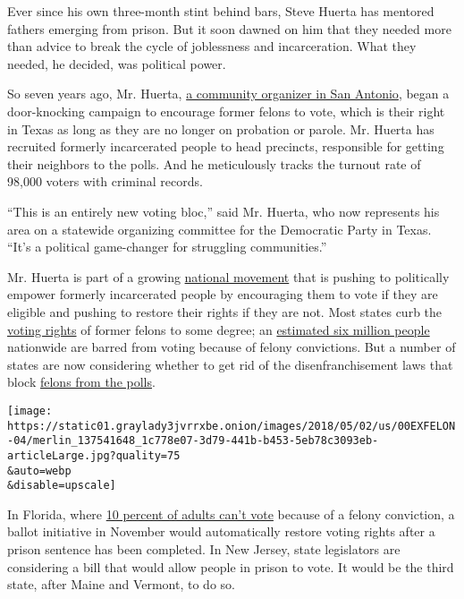 Ever since his own three-month stint behind bars, Steve Huerta has
mentored fathers emerging from prison. But it soon dawned on him that
they needed more than advice to break the cycle of joblessness and
incarceration. What they needed, he decided, was political power.

So seven years ago, Mr. Huerta,
\href{http://www.prisonerswithchildren.org/our-projects/allofus-or-none/}{a
community organizer in San Antonio}, began a door-knocking campaign to
encourage former felons to vote, which is their right in Texas as long
as they are no longer on probation or parole. Mr. Huerta has recruited
formerly incarcerated people to head precincts, responsible for getting
their neighbors to the polls. And he meticulously tracks the turnout
rate of 98,000 voters with criminal records.

``This is an entirely new voting bloc,'' said Mr. Huerta, who now
represents his area on a statewide organizing committee for the
Democratic Party in Texas. ``It's a political game-changer for
struggling communities.''

Mr. Huerta is part of a growing
\href{https://ficpmovement.wordpress.com/}{national movement} that is
pushing to politically empower formerly incarcerated people by
encouraging them to vote if they are eligible and pushing to restore
their rights if they are not. Most states curb the
\href{https://www.nytimes3xbfgragh.onion/2020/07/16/us/supreme-court-felons-voting-florida.html}{voting
rights} of former felons to some degree; an
\href{https://www.nytimes3xbfgragh.onion/interactive/2016/10/06/us/unequal-effect-of-laws-that-block-felons-from-voting.html}{estimated
six million people} nationwide are barred from voting because of felony
convictions. But a number of states are now considering whether to get
rid of the disenfranchisement laws that block
\href{https://www.nytimes3xbfgragh.onion/2020/07/16/us/supreme-court-felons-voting-florida.html}{felons
from the polls}.

\texttt{[image: https://static01.graylady3jvrrxbe.onion/images/2018/05/02/us/00EXFELON-04/merlin\_137541648\_1c778e07-3d79-441b-b453-5eb78c3093eb-articleLarge.jpg?quality=75\\\&auto=webp\\\&disable=upscale]}

In Florida, where
\href{https://www.nytimes3xbfgragh.onion/interactive/2016/10/06/us/unequal-effect-of-laws-that-block-felons-from-voting.html}{10
percent of adults can't vote} because of a felony conviction, a ballot
initiative in November would automatically restore voting rights after a
prison sentence has been completed. In New Jersey, state legislators are
considering a bill that would allow people in prison to vote. It would
be the third state, after Maine and Vermont, to do so.

